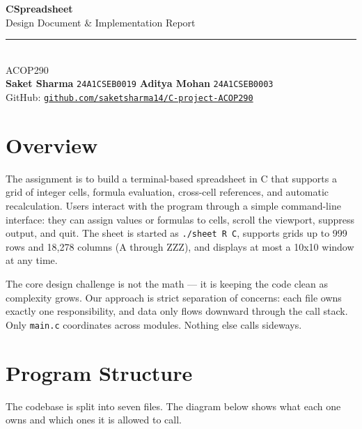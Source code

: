 \documentclass[11pt,a4paper]{article}
\begin{document}
\begin{center}
  {\LARGE\bfseries\color{primaryblue} CSpreadsheet}\\[4pt]
  {\large\color{codegray} Design Document \& Implementation Report}\\[6pt]
  \textcolor{lightborder}{\rule{0.6\textwidth}{0.8pt}}\\[6pt]
  {\small ACOP290}\\[6pt]
  {\small
    \textbf{Saket Sharma} \quad \texttt{24A1CSEB0019} \qquad
    \textbf{Aditya Mohan} \quad \texttt{24A1CSEB0003}
  }\\[4pt]
  {\small\color{codegray}
    GitHub: \href{https://github.com/saketsharma14/C-project-ACOP290}{\texttt{github.com/saketsharma14/C-project-ACOP290}}
  }
\end{center}

\vspace{6pt}

\section{Overview}

The assignment is to build a terminal-based spreadsheet in C that supports a grid of integer cells, formula evaluation, cross-cell references, and automatic recalculation. Users interact with the program through a simple command-line interface: they can assign values or formulas to cells, scroll the viewport, suppress output, and quit. The sheet is started as \texttt{./sheet R C}, supports grids up to 999 rows and 18,278 columns (A through ZZZ), and displays at most a 10x10 window at any time.

The core design challenge is not the math --- it is keeping the code clean as complexity grows. Our approach is strict separation of concerns: each file owns exactly one responsibility, and data only flows downward through the call stack. Only \texttt{main.c} coordinates across modules. Nothing else calls sideways.

\section{Program Structure}

The codebase is split into seven files. The diagram below shows what each one owns and which ones it is allowed to call.
\end{document}
